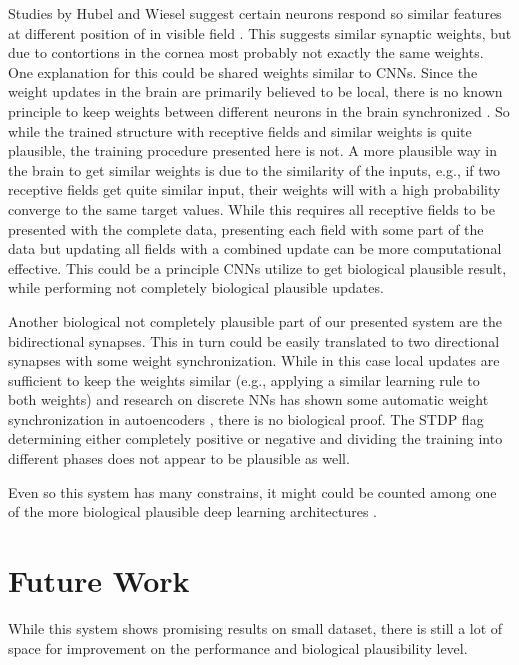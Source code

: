 Studies by Hubel and Wiesel suggest certain neurons respond so similar features at different position of in visible field \cite{Hubel1959}.
This suggests similar synaptic weights, but due to contortions in the cornea most probably not exactly the same weights. 
One explanation for this could be shared weights similar to CNNs. 
Since the weight updates in the brain are primarily believed to be local, there is no known principle to keep weights between different neurons in the brain synchronized \cite{DBLP:journals/corr/ScellierB16}.
So while the trained structure with receptive fields and similar weights is quite plausible, the training procedure presented here is not.
A more plausible way in the brain to get similar weights is due to the similarity of the inputs, e.g., if two receptive fields get quite similar input, their weights will with a high probability converge to the same target values.  
While this requires all receptive fields to be presented with the complete data, presenting each field with some part of the data but updating all fields with a combined update can be more computational effective. 
This could be a principle CNNs utilize to get biological plausible result, while performing not completely biological plausible updates.

Another biological not completely plausible part of our presented system are the bidirectional synapses.
This in turn could be easily translated to two directional synapses with some weight synchronization. 
While in this case local updates are sufficient to keep the weights similar (e.g., applying a similar learning rule to both weights) and research on discrete NNs has shown some automatic weight synchronization in autoencoders \cite{vincent2010stacked}, there is no biological proof.
The STDP flag determining either completely positive or negative and dividing the training into different phases does not appear to be plausible as well.

Even so this system has many constrains, it might could be counted among one of the more biological plausible deep learning architectures \cite{bengio2015towards}.     

\section{Future Work} \label{c:future}

While this system shows promising results on small dataset, there is still a lot of space for improvement on the performance and biological plausibility level.


